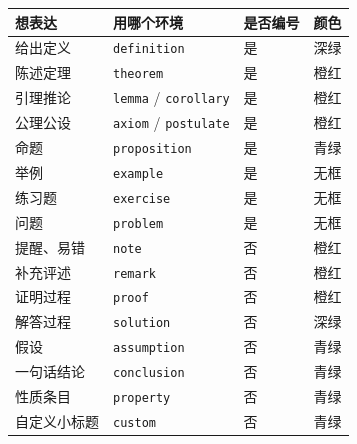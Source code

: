 \documentclass[lang=cn,newtx,10pt,scheme=chinese,nofont]{elegantbook}
\begin{document}
\begin{center}
    \begin{tabular}{llll}
        \toprule
        想表达 & 用哪个环境 & 是否编号 & 颜色 \\
        \midrule
        给出定义 & \texttt{definition} & 是 & 深绿 \\
        陈述定理 & \texttt{theorem}    & 是 & 橙红 \\
        引理推论 & \texttt{lemma} / \texttt{corollary} & 是 & 橙红 \\
        公理公设 & \texttt{axiom} / \texttt{postulate} & 是 & 橙红 \\
        命题 & \texttt{proposition} & 是 & 青绿 \\
        举例 & \texttt{example}      & 是 & 无框 \\
        练习题 & \texttt{exercise}     & 是 & 无框 \\
        问题 & \texttt{problem} & 是 & 无框 \\
        提醒、易错 & \texttt{note}       & 否 & 橙红 \\
        补充评述 & \texttt{remark}       & 否 & 橙红 \\
        证明过程 & \texttt{proof}        & 否 & 橙红 \\
        解答过程 & \texttt{solution}     & 否 & 深绿 \\
        假设 & \texttt{assumption} & 否 & 青绿 \\
        一句话结论 & \texttt{conclusion} & 否 & 青绿 \\
        性质条目 & \texttt{property} & 否 & 青绿 \\
        自定义小标题 & \texttt{custom} & 否 & 青绿 \\
        \bottomrule
    \end{tabular}
\end{center}
\end{document}
